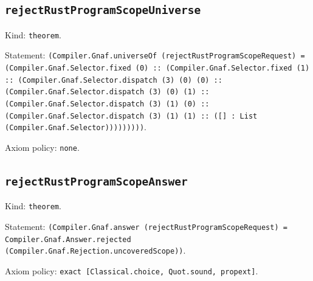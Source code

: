\documentclass[11pt]{article}
\begin{document}
\subsection*{\texttt{rejectRustProgramScopeUniverse}}
\noindent Kind: \texttt{theorem}.\par
\noindent Statement: \texttt{(Compiler.Gnaf.universeOf (rejectRustProgramScopeRequest) = (Compiler.Gnaf.Selector.fixed (0) :: (Compiler.Gnaf.Selector.fixed (1) :: (Compiler.Gnaf.Selector.dispatch (3) (0) (0) :: (Compiler.Gnaf.Selector.dispatch (3) (0) (1) :: (Compiler.Gnaf.Selector.dispatch (3) (1) (0) :: (Compiler.Gnaf.Selector.dispatch (3) (1) (1) :: ([] : List (Compiler.Gnaf.Selector)))))))))}.\par
\noindent Axiom policy: \texttt{none}.\par
\subsection*{\texttt{rejectRustProgramScopeAnswer}}
\noindent Kind: \texttt{theorem}.\par
\noindent Statement: \texttt{(Compiler.Gnaf.answer (rejectRustProgramScopeRequest) = Compiler.Gnaf.Answer.rejected (Compiler.Gnaf.Rejection.uncoveredScope))}.\par
\noindent Axiom policy: \texttt{exact [Classical.choice, Quot.sound, propext]}.\par
\end{document}
